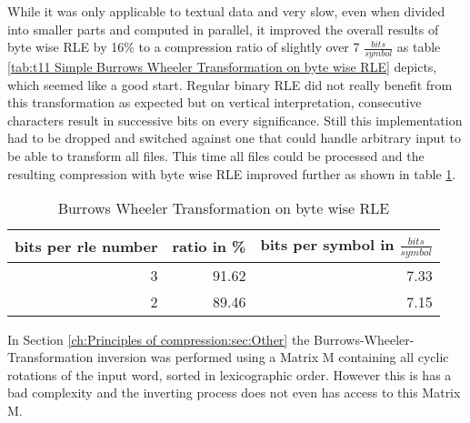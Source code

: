 \par{
While it was only applicable to textual data and very slow, even when divided into smaller parts and computed in parallel, it improved the overall results of byte wise RLE by 16\% to a compression ratio of slightly over 7 $\frac{bits}{symbol}$ as table \ref{tab:t11 Simple Burrows Wheeler Transformation on byte wise RLE} depicts, which seemed like a good start. Regular binary RLE did not really benefit from this transformation as expected but on vertical interpretation, consecutive characters result in successive bits on every significance. Still this implementation had to be dropped and switched against one that could handle arbitrary input to be able to transform all files. This time all files could be processed and the resulting compression with byte wise RLE improved further as shown in table \ref{tab:t12 Burrows Wheeler Transformation on byte wise RLE}.

\begin{table}[H]
	\centering
	\begin{tabular}{r|r|r}	
		bits per rle number & ratio in \% & bits per symbol in $\frac{bits}{symbol}$\\
		\hline
		3 & 91.62 & 7.33\\
		2 & 89.46 & 7.15
	\end{tabular}
	\caption{Burrows Wheeler Transformation on byte wise RLE}
	\label{tab:t12 Burrows Wheeler Transformation on byte wise RLE}
\end{table}
}

\par{
In Section \ref{ch:Principles of compression:sec:Other} the Burrows-Wheeler-Transformation inversion was performed using a Matrix M containing all cyclic rotations of the input word, sorted in lexicographic order. However this is has a bad complexity and the inverting process does not even has access to this Matrix M.\\
}

